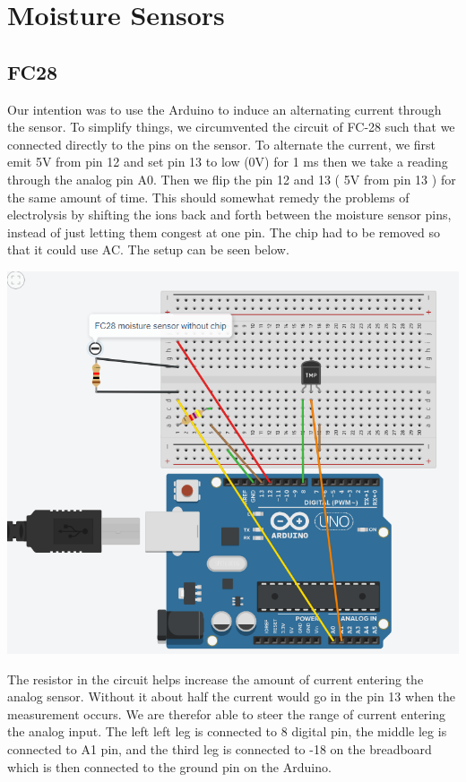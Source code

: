 \documentclass[a4paper,12pt,twoside,openright,titlepage]{book}
\begin{document}
\section{Moisture Sensors}
\subsection{FC28}
Our intention was to use the Arduino to induce an alternating current through the sensor. To simplify things, we circumvented the circuit of FC-28 such that we connected directly to the pins on the sensor. To alternate the current, we first emit 5V from pin 12 and set pin 13 to low (0V) for 1 ms then we take a reading through the analog pin A0. Then we flip the pin 12 and 13 ( 5V from pin 13 ) for the same amount of time. This should somewhat remedy the problems of electrolysis by shifting the ions back and forth between the moisture sensor pins, instead of just letting them congest at one pin. The chip had to be removed so that it could use AC.
The setup can be seen below.


\includegraphics[scale = 0.50]{FC-28-Diagram.PNG}

The resistor in the circuit helps increase the amount of current entering the analog sensor. Without it about half the current would go in the pin 13 when the measurement occurs. We are therefor able to steer the range of current entering the analog input. The left left leg is connected to 8 digital pin, the middle leg is connected to A1 pin, and the third leg is connected to -18 on the breadboard which is then connected to the ground pin on the Arduino.  
\end{document}

